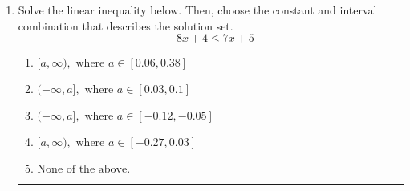 \documentclass[14pt]{extbook}
\newcommand{\litem}[1]{\item#1\hspace*{-1cm}\rule{\textwidth}{0.4pt}}
\begin{document}
\begin{enumerate}
{\begin{enumerate}[label=\Alph*.]
\end{enumerate} }
\litem{
Solve the linear inequality below. Then, choose the constant and interval combination that describes the solution set.\[ -8x + 4 \leq 7x + 5 \]\begin{enumerate}[label=\Alph*.]
\item \( [a, \infty), \text{ where } a \in [0.06, 0.38] \)
\item \( (-\infty, a], \text{ where } a \in [0.03, 0.1] \)
\item \( (-\infty, a], \text{ where } a \in [-0.12, -0.05] \)
\item \( [a, \infty), \text{ where } a \in [-0.27, 0.03] \)
\item \( \text{None of the above}. \)

\end{enumerate} }
\end{enumerate}
\end{document}
